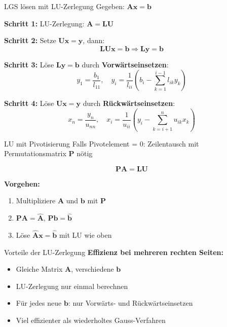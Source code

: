 \documentclass[a4paper, fontsize=7pt]{scrartcl}
\begin{document}
\begin{subbox}{LGS lösen mit LU-Zerlegung}
Gegeben: $\mathbf{Ax} = \mathbf{b}$

\textbf{Schritt 1:} LU-Zerlegung: $\mathbf{A} = \mathbf{LU}$

\textbf{Schritt 2:} Setze $\mathbf{Ux} = \mathbf{y}$, dann:
$$\mathbf{LUx} = \mathbf{b} \Rightarrow \mathbf{Ly} = \mathbf{b}$$

\textbf{Schritt 3:} Löse $\mathbf{Ly} = \mathbf{b}$ durch \textbf{Vorwärtseinsetzen}:
$$y_1 = \frac{b_1}{l_{11}}, \quad y_i = \frac{1}{l_{ii}}\left(b_i - \sum_{k=1}^{i-1} l_{ik}y_k\right)$$

\textbf{Schritt 4:} Löse $\mathbf{Ux} = \mathbf{y}$ durch \textbf{Rückwärtseinsetzen}:
$$x_n = \frac{y_n}{u_{nn}}, \quad x_i = \frac{1}{u_{ii}}\left(y_i - \sum_{k=i+1}^{n} u_{ik}x_k\right)$$
\end{subbox}

\begin{subbox}{LU mit Pivotisierung}
Falls Pivotelement = 0: Zeilentausch mit Permutationsmatrix $\mathbf{P}$ nötig

$$\mathbf{PA} = \mathbf{LU}$$

\textbf{Vorgehen:}
\begin{enumerate}
    \item Multipliziere $\mathbf{A}$ und $\mathbf{b}$ mit $\mathbf{P}$
    \item $\mathbf{PA} = \hat{\mathbf{A}}$, $\mathbf{Pb} = \hat{\mathbf{b}}$
    \item Löse $\hat{\mathbf{A}}\mathbf{x} = \hat{\mathbf{b}}$ mit LU wie oben
\end{enumerate}
\end{subbox}

\begin{subbox}{Vorteile der LU-Zerlegung}
\textbf{Effizienz bei mehreren rechten Seiten:}
\begin{itemize}
    \item Gleiche Matrix $\mathbf{A}$, verschiedene $\mathbf{b}$
    \item LU-Zerlegung nur einmal berechnen
    \item Für jedes neue $\mathbf{b}$: nur Vorwärts- und Rückwärtseinsetzen
    \item Viel effizienter als wiederholtes Gauss-Verfahren
\end{itemize}
\end{subbox}

\end{document}

